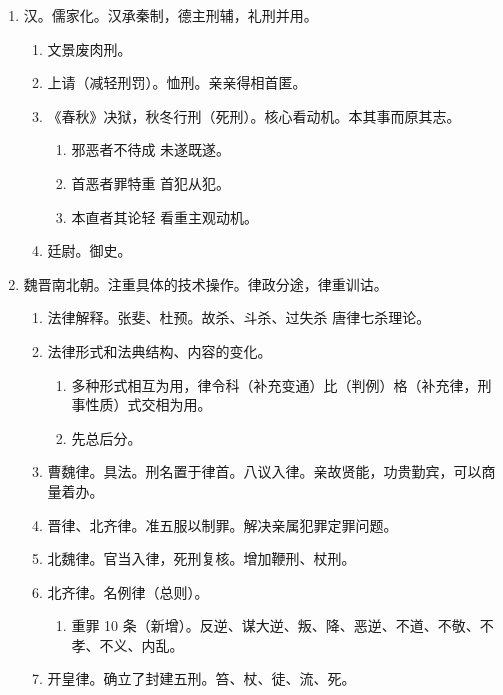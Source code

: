 \begin{enumerate}
\begin{enumerate}
          \item 按身高确定刑事能力。
        \end{enumerate}
  \item 汉。儒家化。汉承秦制，德主刑辅，礼刑并用。
        \begin{enumerate}
          \item 文景废肉刑。
          \item 上请（减轻刑罚）。恤刑。亲亲得相首匿。
          \item 《春秋》决狱，秋冬行刑（死刑）。核心看动机。本其事而原其志。
                \begin{enumerate}
                  \item 邪恶者不待成 \yjt 未遂既遂。
                  \item 首恶者罪特重 \yjt 首犯从犯。
                  \item 本直者其论轻 \yjt 看重主观动机。
                \end{enumerate}
          \item 廷尉。御史。
        \end{enumerate}
  \item 魏晋南北朝。注重具体的技术操作。律政分途，律重训诂。
        \begin{enumerate}
          \item 法律解释。张斐、杜预。故杀、斗杀、过失杀 \yjt 唐律七杀理论。
          \item 法律形式和法典结构、内容的变化。
                \begin{enumerate}
                  \item 多种形式相互为用，律令科（补充变通）比（判例）格（补充律，刑事性质）式交相为用。
                  \item 先总后分。
                \end{enumerate}
          \item 曹魏律。\yi 具法。刑名置于律首。\er 八议入律。亲故贤能，功贵勤宾，可以商量着办。
          \item 晋律、北齐律。准五服以制罪。解决亲属犯罪定罪问题。
          \item 北魏律。官当入律，死刑复核。增加鞭刑、杖刑。
          \item 北齐律。名例律（总则）。
                \begin{enumerate}
                  \item 重罪 10 条（新增）。反逆、谋大逆、叛、降、恶逆、不道、不敬、不孝、不义、内乱。
                \end{enumerate}
          \item 开皇律。确立了封建五刑。笞、杖、徒、流、死。

\end{enumerate}
\end{enumerate}
